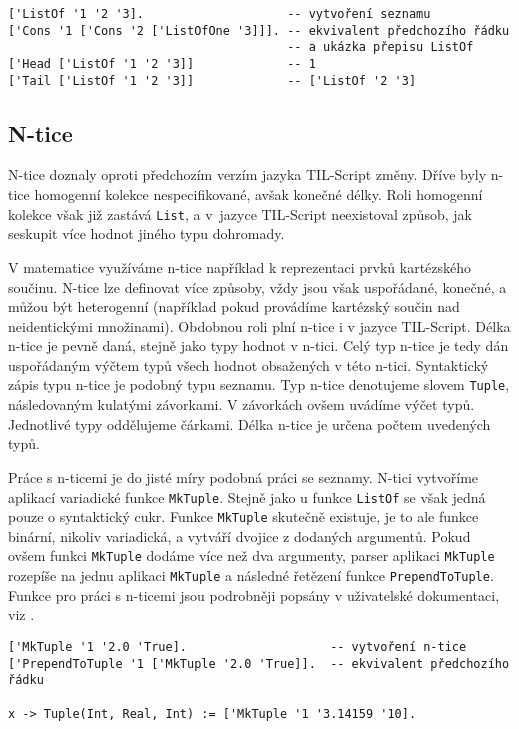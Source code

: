 \begin{lstlisting}[caption={Příklad využití seznamů}]
['ListOf '1 '2 '3].                    -- vytvoření seznamu
['Cons '1 ['Cons '2 ['ListOfOne '3]]]. -- ekvivalent předchozího řádku
                                       -- a ukázka přepisu ListOf
['Head ['ListOf '1 '2 '3]]             -- 1
['Tail ['ListOf '1 '2 '3]]             -- ['ListOf '2 '3]
\end{lstlisting}

\subsection{N-tice}

N-tice doznaly oproti předchozím verzím jazyka TIL-Script změny. Dříve byly n-tice homogenní kolekce
nespecifikované, avšak konečné délky. Roli homogenní kolekce však již zastává \lstinline{List}, a
v~jazyce TIL-Script neexistoval způsob, jak seskupit více hodnot jiného typu dohromady.

V matematice využíváme n-tice například k reprezentaci prvků kartézského součinu. N-tice lze
definovat více způsoby, vždy jsou však uspořádané, konečné, a můžou být heterogenní (například
pokud provádíme kartézský součin nad neidentickými množinami). Obdobnou roli plní n-tice i v jazyce
TIL-Script. Délka n-tice je pevně daná, stejně jako typy hodnot v n-tici. Celý typ n-tice je
tedy dán uspořádaným výčtem typů všech hodnot obsažených v této n-tici. Syntaktický zápis
typu n-tice je podobný typu seznamu. Typ n-tice denotujeme slovem \lstinline{Tuple}, následovaným
kulatými závorkami. V závorkách ovšem uvádíme výčet typů. Jednotlivé typy oddělujeme čárkami. Délka
n-tice je určena počtem uvedených typů.

Práce s n-ticemi je do jisté míry podobná práci se seznamy. N-tici vytvoříme aplikací variadické
funkce \lstinline{MkTuple}. Stejně jako u funkce \lstinline{ListOf} se však jedná pouze o
syntaktický cukr. Funkce \lstinline{MkTuple} skutečně existuje, je to ale funkce binární, nikoliv
variadická, a vytváří dvojice z dodaných argumentů. Pokud ovšem funkci \lstinline{MkTuple} dodáme
více než dva argumenty, parser aplikaci \lstinline{MkTuple} rozepíše na jednu aplikaci
\lstinline{MkTuple} a následné řetězení funkce \lstinline{PrependToTuple}. Funkce pro práci
s n-ticemi jsou podrobněji popsány v uživatelské dokumentaci, viz .
 
\begin{lstlisting}[caption={Příklad využití n-tic}]
['MkTuple '1 '2.0 'True].                    -- vytvoření n-tice
['PrependToTuple '1 ['MkTuple '2.0 'True]].  -- ekvivalent předchozího řádku

x -> Tuple(Int, Real, Int) := ['MkTuple '1 '3.14159 '10].
\end{lstlisting}

